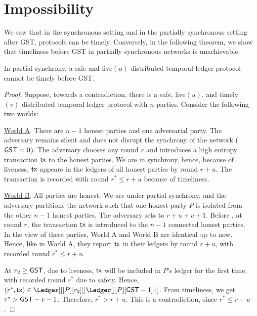 \section{Impossibility}\label{sec:impossibility}

We saw that in the synchronous setting and in the partially synchronous setting after GST,
protocols can be timely.
Conversely, in the following theorem, we show that timeliness before GST in partially
synchronous networks is unachievable.

\begin{theorem}
  In partial synchrony, a
  safe and live$(u)$
  distributed temporal ledger protocol cannot be timely before GST.
\end{theorem}
\begin{proof}
  Suppose, towards a contradiction, there is a safe, live$(u)$, and timely$(v)$ distributed temporal ledger protocol
  with $n$ parties.
  Consider the following two worlds:

  \noindent
  \underline{World A}.
  There are $n-1$ honest parties and one adversarial party. The adversary remains silent and
  does not disrupt the synchrony of the network ($\textsf{GST} = 0$).
  The adversary chooses any round $r$ and introduces a high entropy transaction $\textsf{tx}$ to the honest parties. We are in
  synchrony, hence, because of liveness, $\textsf{tx}$ appears in the ledgers of all honest parties
  by round $r + u$. The transaction is recorded with round $r^* \leq r + u$ because of
  timeliness.

  \noindent
  \underline{World B}.
  All parties are honest. We are under partial synchrony, and the adversary partitions the network such that
  one honest party $P$ is isolated from the other $n-1$ honest parties.
  The adversary sets \gst to  $r + u + v + 1$.
  Before \gst, at round $r$, the transaction $\textsf{tx}$ is introduced to the $n-1$ connected
  honest parties. In the view of these parties,
  World A and World B are identical up to now. Hence, like in World A,
  they report $\textsf{tx}$ in their ledgers by round $r + u$, with recorded round $r^* \leq r + u$.

  At $r_2 \geq \textsf{GST}$, due to liveness, $\textsf{tx}$ will be included in $P$'s ledger for the first time,
  with recorded round $r^*$ due to safety.
  Hence, $(r^*, \tx) \in \Ledger[][P][r_2][{|\Ledger[][P][\gst - 1]|}{:}]$.
  From timeliness, we
  get $r^* > \textsf{GST} - v - 1$. Therefore, $r^* > r + u$.
  This is a contradiction, since $r^* \leq r + u$.
  \Qed
\end{proof}
